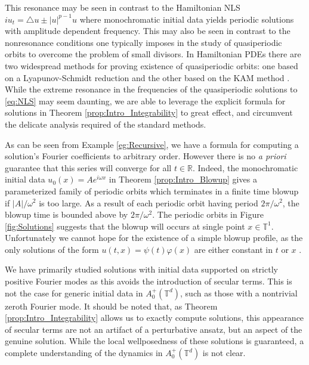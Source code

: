 \documentclass{article}
\newcommand{\R}{\mathbb{R}}
\newcommand{\T}{\mathbb{T}}
\begin{document}
This resonance may be seen in contrast to the Hamiltonian NLS $ i u_t = \triangle u \pm |u|^{p-1} u$ where monochromatic initial data yields periodic solutions with amplitude dependent frequency. 
This may also be seen in contrast to the nonresonance conditions one typically imposes in the study of quasiperiodic orbits to overcome the problem of small divisors.
In Hamiltonian PDEs there are two widespread methods for proving existence of quasiperiodic orbits: one based on a Lyapunov-Schmidt reduction \cite{craig1993newton,bourgain1998quasi} and the other based on the KAM method \cite{kuksin1996invariant,procesi2015kam}. 
While the extreme resonance in the frequencies of the quasiperiodic solutions to \eqref{eq:NLS} may seem daunting, we are able to leverage the explicit formula for solutions in Theorem \ref{prop:Intro_Integrability} to great effect, and  circumvent the delicate analysis required of the standard  methods. 



As can be seen from Example \ref{eg:Recursive}, we have a formula for computing a solution's Fourier coefficients to arbitrary order. However there is no \emph{a priori} guarantee that this series will converge for all $ t \in \R$.  
Indeed, the monochromatic initial data $u_0(x) = A e^{i \omega x}$ in Theorem \ref{prop:Intro_Blowup} gives a parameterized family of periodic orbits which terminates in a finite time blowup if $ |A| / \omega^2 $ is too large. 
As a result of each periodic orbit having period $2 \pi / \omega^2$, the blowup time is bounded above by $ 2 \pi / \omega^2$. 
The periodic orbits in Figure \ref{fig:Solutions} suggests that the blowup will occurs at single point $ x \in \T^1$. 
Unfortunately  we cannot hope for the existence of a simple blowup profile, as the only solutions of the form $ u(t,x) = \psi(t) \varphi(x)$ are either constant in $t$ or $x$ \cite{jaquette2020global}. 

We have primarily studied solutions with initial data supported on strictly positive Fourier modes  
as this avoids the introduction of secular terms. 
This is not the case for generic initial data in $ A_0^+(\T^d)$, such as those with a nontrivial zeroth Fourier mode. 
It should be noted that, as Theorem \ref{prop:Intro_Integrability} allows us to exactly compute solutions, this appearance of secular terms are not an artifact of a perturbative ansatz, but an aspect  of the genuine solution.  
While the local wellposedness of these solutions is guaranteed, a complete understanding of the dynamics in $A_0^+(\T^d)$  is not clear. 
\end{document}
